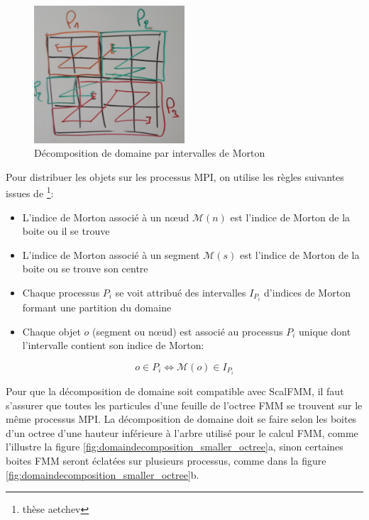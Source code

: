 \begin{figure}[]
    \centering
    \includegraphics[width=0.5\textwidth]{img/domaindecomposition_morton_interval}
    \caption{Décomposition de domaine par intervalles de Morton}
    \label{fig:domaindecomposition_morton_interval}
\end{figure}

Pour distribuer les objets sur les processus MPI, on utilise les règles suivantes issues de \footnote{thèse aetchev}:
\begin{itemize}
    \item L'indice de Morton associé à un nœud $\mathcal{M}(n)$ est l'indice de Morton de la boite ou il se trouve
    \item L'indice de Morton associé à un segment $\mathcal{M}(s)$ est l'indice de Morton de la boite ou se trouve son centre
    \item Chaque processus $P_i$ se voit attribué des intervalles $I_{P_i}$ d'indices de Morton formant une partition du domaine
    \item Chaque objet $o$ (segment ou nœud) est associé au processus $P_i$ unique dont l'intervalle contient son indice de Morton:
\end{itemize}

\begin{equation}
    o \in P_i \Leftrightarrow \mathcal{M}(o) \in I_{P_i}
\end{equation}

Pour que la décomposition de domaine soit compatible avec ScalFMM, il faut s'assurer que toutes les particules d'une feuille de l'octree FMM se trouvent sur le même processus MPI. La décomposition de domaine doit se faire selon les boites d'un octree d'une hauteur inférieure à l'arbre utilisé pour le calcul FMM, comme l'illustre la figure \ref{fig:domaindecomposition_smaller_octree}a, sinon certaines boites FMM seront éclatées sur plusieurs processus, comme dans la figure \ref{fig:domaindecomposition_smaller_octree}b.


